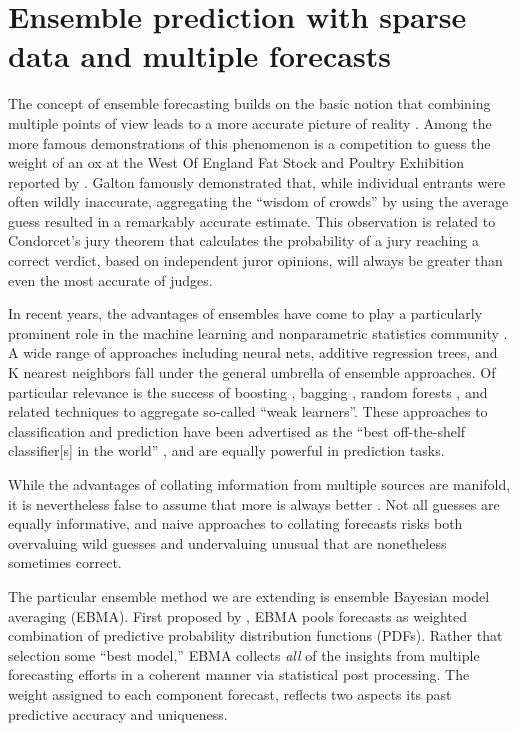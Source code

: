 \documentclass[12pt,fullpage,endnotes]{article}
\begin{document}
\section{Ensemble prediction with sparse data and multiple forecasts }
\label{theproblem}

The concept of ensemble forecasting builds on the basic notion that
combining multiple points of view leads to a more accurate picture of
reality \citep[c.f.,][]{Surowiecki:2004}.  Among the more famous
demonstrations of this phenomenon is a competition to guess the weight
of an ox at the West Of England Fat Stock and Poultry Exhibition
reported by \citet{Galton:1907}.  Galton famously demonstrated that,
while individual entrants were often wildly inaccurate, aggregating
the ``wisdom of crowds'' by using the average guess resulted in a
remarkably accurate estimate.  This observation is related to
Condorcet's jury theorem that calculates the probability of a jury
reaching a correct verdict, based on independent juror opinions, will always be greater than even the most accurate
of judges.

In recent years, the advantages of ensembles have come to play a
particularly prominent role in the machine learning and nonparametric
statistics community \citep{Hastie:2009}. A wide range of approaches
including neural nets, additive regression trees, and K nearest
neighbors fall under the general umbrella of ensemble approaches.  Of
particular relevance is the success of boosting \citep{Freund:1997,
  Friedman:2001}, bagging \citep{Breiman:1996}, random forests
\citep{Breiman:2001}, and related techniques
\citep[e.g.,][]{Chipman:2010} to aggregate so-called ``weak
learners''.  These approaches to classification and prediction have
been advertised as the ``best off-the-shelf classifier[s] in the
world'' \citep{Breiman:1996}, and are equally powerful in prediction
tasks.

While the advantages of collating information from multiple sources
are manifold, it is nevertheless false to assume that more is always
better \citep[c.f.,][]{Page:2011}.  Not all guesses are equally
informative, and naive approaches to collating forecasts risks both
overvaluing wild guesses and undervaluing unusual that are nonetheless
sometimes correct.  

The particular ensemble method we are extending is ensemble Bayesian
model averaging (EBMA). First proposed by \citet{Raftery:2005}, EBMA
pools forecasts as weighted combination of predictive probability
distribution functions (PDFs).  Rather that selection some ``best
model,'' EBMA collects \textit{all} of the insights from multiple
forecasting efforts in a coherent manner via statistical post
processing.  The weight assigned to each component forecast, reflects
two aspects its past predictive accuracy and uniqueness. 
\end{document}
